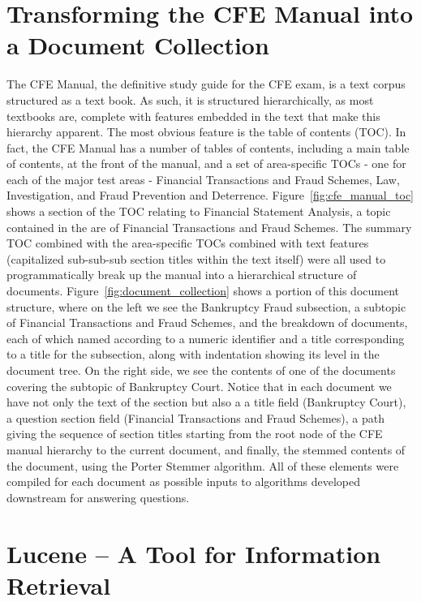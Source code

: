 \section{Transforming the CFE Manual into a Document Collection}

The CFE Manual, the definitive study guide for the CFE exam, is a text corpus structured as a text book. As such, it is structured hierarchically, as most textbooks are, complete with features embedded in the text that make this hierarchy apparent.  The most obvious feature is the table of contents (TOC).  In fact, the CFE Manual has a number of tables of contents, including a main table of contents, at the front of the manual, and a set of area-specific TOCs - one for each of the major test areas - Financial Transactions and Fraud Schemes, Law, Investigation, and Fraud Prevention and Deterrence.  Figure~\ref{fig:cfe_manual_toc} shows a section of the TOC relating to Financial Statement Analysis, a topic contained in the are of Financial Transactions and Fraud Schemes.  The summary TOC combined with the area-specific TOCs combined with text features (capitalized sub-sub-sub section titles within the text itself) were all used to programmatically break up the manual into a hierarchical structure of documents.  Figure~\ref{fig:document_collection} shows a portion of this document structure, where on the left we see the Bankruptcy Fraud subsection, a subtopic of Financial Transactions and Fraud Schemes, and the breakdown of documents, each of which named according to a numeric identifier and a title corresponding to a title for the subsection, along with indentation showing its level in the document tree.  On the right side, we see the contents of one of the documents covering the subtopic of Bankruptcy Court.  Notice that in each document we have not only the text of the section but also a a title field (Bankruptcy Court), a question section field (Financial Transactions and Fraud Schemes), a path giving the sequence of section titles starting from the root node of the CFE manual hierarchy to the current document, and finally, the stemmed contents of the document, using the Porter Stemmer algorithm.  All of these elements were compiled for each document as possible inputs to algorithms developed downstream for answering questions.  

\section{Lucene -- A Tool for Information Retrieval}

